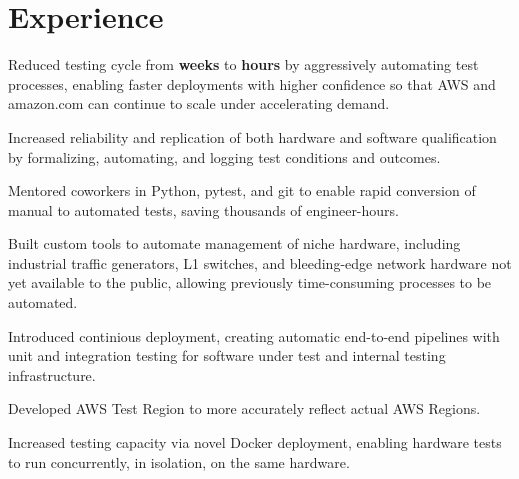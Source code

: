 \documentclass[]{resume}
\begin{document}
\begin{minipage}[t]{0.66\textwidth} 


\section{Experience}
\vspace{\topsep} %
\begin{tightemize}
\item Reduced testing cycle from \textbf{weeks} to \textbf{hours} by aggressively automating test processes, enabling faster deployments with higher confidence so that AWS and amazon.com can continue to scale under accelerating demand.
\item Increased reliability and replication of both hardware and software qualification by formalizing, automating, and logging test conditions and outcomes.
\item Mentored coworkers in Python, pytest, and git to enable rapid conversion of manual to automated tests, saving thousands of engineer-hours.
\item Built custom tools to automate management of niche hardware, including industrial traffic generators, L1 switches, and bleeding-edge network hardware not yet available to the public, allowing previously time-consuming processes to be automated.
\item Introduced continious deployment, creating automatic end-to-end pipelines with unit and integration testing for software under test and internal testing infrastructure.
\item Developed AWS Test Region to more accurately reflect actual AWS Regions.
\item Increased testing capacity via novel Docker deployment, enabling hardware tests to run concurrently, in isolation, on the same hardware.
\end{tightemize}
\sectionsep
\sectionsep


\end{minipage}
\end{document}
